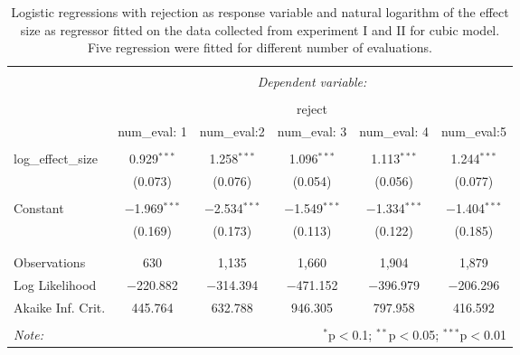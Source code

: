 \documentclass[]{interact}
\theoremstyle{plain}%
\theoremstyle{definition}
\theoremstyle{remark}
\begin{document}
\begin{table}[!htbp] \centering 
  \caption{Logistic regressions with rejection as response variable and natural logarithm of the effect size as regressor fitted on the data collected from experiment I and II for cubic model. Five regression were fitted for different number of evaluations.} 
  \label{tab:powerglmcubic} 
\begin{tabular}{@{\extracolsep{5pt}}lccccc} 
\\[-1.8ex]\hline 
\hline \\[-1.8ex] 
 & \multicolumn{5}{c}{\textit{Dependent variable:}} \\ 
\cline{2-6} 
\\[-1.8ex] & \multicolumn{5}{c}{reject} \\ 
 & num\_eval: 1 & num\_eval:2 & num\_eval: 3 & num\_eval: 4 & num\_eval:5 \\ 
\hline \\[-1.8ex] 
 log\_effect\_size & 0.929$^{***}$ & 1.258$^{***}$ & 1.096$^{***}$ & 1.113$^{***}$ & 1.244$^{***}$ \\ 
  & (0.073) & (0.076) & (0.054) & (0.056) & (0.077) \\ 
  & & & & & \\ 
 Constant & $-$1.969$^{***}$ & $-$2.534$^{***}$ & $-$1.549$^{***}$ & $-$1.334$^{***}$ & $-$1.404$^{***}$ \\ 
  & (0.169) & (0.173) & (0.113) & (0.122) & (0.185) \\ 
  & & & & & \\ 
\hline \\[-1.8ex] 
Observations & 630 & 1,135 & 1,660 & 1,904 & 1,879 \\ 
Log Likelihood & $-$220.882 & $-$314.394 & $-$471.152 & $-$396.979 & $-$206.296 \\ 
Akaike Inf. Crit. & 445.764 & 632.788 & 946.305 & 797.958 & 416.592 \\ 
\hline 
\hline \\[-1.8ex] 
\textit{Note:}  & \multicolumn{5}{r}{$^{*}$p$<$0.1; $^{**}$p$<$0.05; $^{***}$p$<$0.01} \\ 
\end{tabular} 
\end{table}
\end{document}
